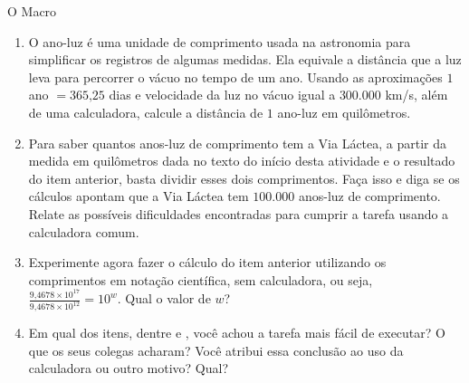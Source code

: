 \begin{task}{O Macro}
\begin{enumerate}
\item {} 
O ano-luz é uma unidade de comprimento usada na astronomia para simplificar os registros de algumas medidas. Ela equivale a distância que a luz leva para percorrer o vácuo no tempo de um ano. Usando as aproximações $1$ ano $= 365\text{,}25$ dias e velocidade da luz no vácuo igual a $300.000$ km/s, além de uma calculadora, calcule a distância de $1$ ano-luz em quilômetros.

\item {} 
Para saber quantos anos-luz de comprimento tem a Via Láctea, a partir da medida em quilômetros dada no texto do início desta atividade e o resultado do item anterior, basta dividir esses dois comprimentos. Faça isso e diga se os cálculos apontam que a Via Láctea tem $100.000$ anos-luz de comprimento. Relate as possíveis dificuldades encontradas para cumprir a tarefa usando a calculadora comum.

\item {} 
Experimente agora fazer o cálculo do item anterior utilizando os comprimentos em notação científica, sem calculadora, ou seja, $\displaystyle\frac{9\text{,}4678 \times 10^{17}}{9\text{,}4678 \times 10^{12}}=10^w$. Qual o valor de $w$?

\item {} 
Em qual dos itens, dentre  e , você achou a tarefa mais fácil de executar? O que os seus colegas acharam? Você atribui essa conclusão ao uso da calculadora ou outro motivo? Qual?

\end{enumerate}
\end{task}

\clearpage


